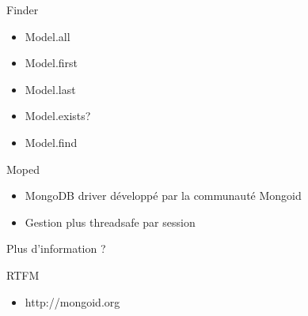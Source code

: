 \documentclass{beamer}
\begin{document}
\begin{frame}
  \begin{center}
    \Huge{}
    Finder
  \end{center}

  \begin{itemize}
    \item Model.all
    \item Model.first
    \item Model.last
    \item Model.exists?
    \item Model.find
  \end{itemize}

\end{frame}

\begin{frame}
  \begin{center}
    \Huge{}
    Moped
  \end{center}

  \begin{center}
    \begin{itemize}
      \item MongoDB driver développé par la communauté Mongoid
      \item Gestion plus threadsafe par session
    \end{itemize}
  \end{center}
\end{frame}

\begin{frame}
  \begin{center}
    \Huge{}
    Plus d'information ?
  \end{center}

  \begin{center}
    RTFM
  \end{center}

  \begin{itemize}
    \item http://mongoid.org
  \end{itemize}
\end{frame}
\end{document}
